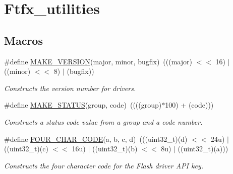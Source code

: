 \hypertarget{group__ftfx__utilities}{}\section{Ftfx\+\_\+utilities}
\label{group__ftfx__utilities}
\subsection*{Macros}
\begin{DoxyCompactItemize}
\item 
\mbox{\label{group__ftfx__utilities_ga812138aa3315b0c6953c1a26130bcc37}} 
\#define \mbox{\hyperlink{group__ftfx__utilities_ga812138aa3315b0c6953c1a26130bcc37}{M\+A\+K\+E\+\_\+\+V\+E\+R\+S\+I\+ON}}(major,  minor,  bugfix)~(((major) $<$$<$ 16) $\vert$ ((minor) $<$$<$ 8) $\vert$ (bugfix))
\begin{DoxyCompactList}\small\item\em Constructs the version number for drivers. \end{DoxyCompactList}\item 
\mbox{\label{group__ftfx__utilities_gad76dfbb0423d0cd3a7b77cbcd9043146}} 
\#define \mbox{\hyperlink{group__ftfx__utilities_gad76dfbb0423d0cd3a7b77cbcd9043146}{M\+A\+K\+E\+\_\+\+S\+T\+A\+T\+US}}(group,  code)~((((group)$\ast$100) + (code)))
\begin{DoxyCompactList}\small\item\em Constructs a status code value from a group and a code number. \end{DoxyCompactList}\item 
\mbox{\label{group__ftfx__utilities_ga3caa666e2a56338f45fa9a008473694d}} 
\#define \mbox{\hyperlink{group__ftfx__utilities_ga3caa666e2a56338f45fa9a008473694d}{F\+O\+U\+R\+\_\+\+C\+H\+A\+R\+\_\+\+C\+O\+DE}}(a,  b,  c,  d)~(((uint32\+\_\+t)(d) $<$$<$ 24u) $\vert$ ((uint32\+\_\+t)(c) $<$$<$ 16u) $\vert$ ((uint32\+\_\+t)(b) $<$$<$ 8u) $\vert$ ((uint32\+\_\+t)(a)))
\begin{DoxyCompactList}\small\item\em Constructs the four character code for the Flash driver A\+PI key. \end{DoxyCompactList}\item 
\mbox{\label{group__ftfx__utilities_ga4ed9b60ad7a3c8d6f78c75f9b3613b9c}} 
$$
\end{DoxyCompactItemize}

